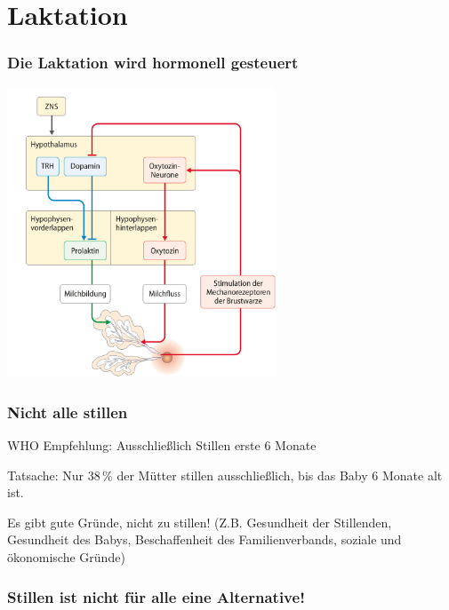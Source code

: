 \documentclass{beamer}
\begin{document}
\section{Laktation}

\begin{frame}
\frametitle{Die Laktation wird hormonell gesteuert}

\begin{center}
    \includegraphics[width=0.6\textwidth]{hormone_laktation.png}
\end{center}

\end{frame}



\begin{frame}
\frametitle{Nicht alle stillen}

\pause

WHO Empfehlung: Ausschließlich Stillen erste 6 Monate 

\pause

Tatsache: Nur \(38\,\%\) der Mütter stillen ausschließlich, bis das Baby 6 Monate alt ist.  

\pause

Es gibt gute  Gründe, nicht zu stillen! (Z.B. Gesundheit der Stillenden, Gesundheit des Babys, Beschaffenheit des Familienverbands, soziale und ökonomische Gründe)



\end{frame}


\begin{frame}
\frametitle{Stillen ist nicht für alle eine Alternative!}



\end{frame}
\end{document}
